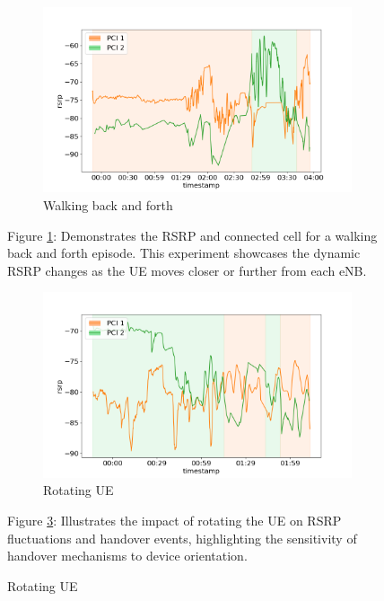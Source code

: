\begin{figure}[p]
    \vspace{1cm}
    \begin{minipage}{0.45\textwidth}
    \begin{subfigure}{.9\linewidth}
        \centering
        \includegraphics[width=0.9\linewidth]{src//img/real_mobile_0.png}
        \caption{Walking back and forth}
        \label{fig:real:mobile:walk}
    \end{subfigure}
    \end{minipage}%
    \begin{minipage}{0.45\textwidth}
        \small{Figure \ref{fig:real:mobile:walk}: Demonstrates the RSRP and connected cell for a walking back and forth episode. This experiment showcases the dynamic RSRP changes as the UE moves closer or further from each eNB.}
    \end{minipage}
    
    \vspace{1cm}
    \begin{minipage}{0.45\textwidth}
    \begin{subfigure}{\linewidth}
        \centering
        \includegraphics[width=0.9\linewidth]{src//img/real_mobile_1.png}
        \caption{Rotating UE}
        \label{fig:real:mobile:rotate}
    \end{subfigure}
    \end{minipage}
    \begin{minipage}{0.45\textwidth}
        \small{Figure \ref{fig:real:mobile:rotate}: Illustrates the impact of rotating the UE on RSRP fluctuations and handover events, highlighting the sensitivity of handover mechanisms to device orientation.}
    \end{minipage}
    

\end{figure}
